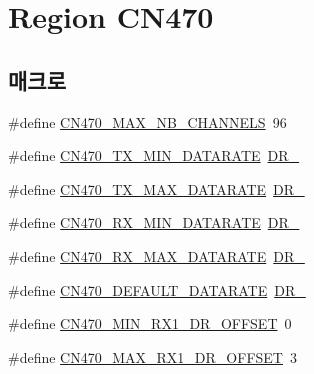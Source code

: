 \hypertarget{group___r_e_g_i_o_n_c_n470}{}\section{Region C\+N470}
\label{group___r_e_g_i_o_n_c_n470}
\subsection*{매크로}
\begin{DoxyCompactItemize}
\item 
\#define \mbox{\hyperlink{group___r_e_g_i_o_n_c_n470_ga8dd3b552d535062e91b0651705041387}{C\+N470\+\_\+\+M\+A\+X\+\_\+\+N\+B\+\_\+\+C\+H\+A\+N\+N\+E\+LS}}~96
\item 
\#define \mbox{\hyperlink{group___r_e_g_i_o_n_c_n470_gafc089f5bdc4ad69267f562d1fda11f79}{C\+N470\+\_\+\+T\+X\+\_\+\+M\+I\+N\+\_\+\+D\+A\+T\+A\+R\+A\+TE}}~\mbox{\hyperlink{group___r_e_g_i_o_n_ga6c4ef966b4f3d5eb7597b087f2b97095}{D\+R\+\_}}
\item 
\#define \mbox{\hyperlink{group___r_e_g_i_o_n_c_n470_ga6124e3e1f145254943806b46c8844c1e}{C\+N470\+\_\+\+T\+X\+\_\+\+M\+A\+X\+\_\+\+D\+A\+T\+A\+R\+A\+TE}}~\mbox{\hyperlink{group___r_e_g_i_o_n_ga872e12c82020c02a7f70a1c6ed1375df}{D\+R\+\_}}
\item 
\#define \mbox{\hyperlink{group___r_e_g_i_o_n_c_n470_ga5aa969a4651406bcd74903035a8cfc4f}{C\+N470\+\_\+\+R\+X\+\_\+\+M\+I\+N\+\_\+\+D\+A\+T\+A\+R\+A\+TE}}~\mbox{\hyperlink{group___r_e_g_i_o_n_ga6c4ef966b4f3d5eb7597b087f2b97095}{D\+R\+\_}}
\item 
\#define \mbox{\hyperlink{group___r_e_g_i_o_n_c_n470_ga32c6368247a51d46cc53dfe9ea8c1d39}{C\+N470\+\_\+\+R\+X\+\_\+\+M\+A\+X\+\_\+\+D\+A\+T\+A\+R\+A\+TE}}~\mbox{\hyperlink{group___r_e_g_i_o_n_ga872e12c82020c02a7f70a1c6ed1375df}{D\+R\+\_}}
\item 
\#define \mbox{\hyperlink{group___r_e_g_i_o_n_c_n470_gab5525fe4b5cbe390c85fc1157a27860f}{C\+N470\+\_\+\+D\+E\+F\+A\+U\+L\+T\+\_\+\+D\+A\+T\+A\+R\+A\+TE}}~\mbox{\hyperlink{group___r_e_g_i_o_n_ga6c4ef966b4f3d5eb7597b087f2b97095}{D\+R\+\_}}
\item 
\#define \mbox{\hyperlink{group___r_e_g_i_o_n_c_n470_gabba9bdb3ecb54ce42aeaf14c3bc639f4}{C\+N470\+\_\+\+M\+I\+N\+\_\+\+R\+X1\+\_\+\+D\+R\+\_\+\+O\+F\+F\+S\+ET}}~0
\item 
\#define \mbox{\hyperlink{group___r_e_g_i_o_n_c_n470_ga2d30070788e36cbb178f0fb025f23a91}{C\+N470\+\_\+\+M\+A\+X\+\_\+\+R\+X1\+\_\+\+D\+R\+\_\+\+O\+F\+F\+S\+ET}}~3

\end{DoxyCompactItemize}
